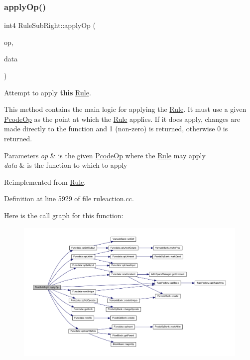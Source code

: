 \subsubsection{\texorpdfstring{applyOp()}{applyOp()}}
{\footnotesize\ttfamily int4 Rule\+Sub\+Right\+::apply\+Op (\begin{DoxyParamCaption}\item[{\mbox{\hyperlink{class_pcode_op}{Pcode\+Op}} $\ast$}]{op,  }\item[{\mbox{\hyperlink{class_funcdata}{Funcdata}} \&}]{data }\end{DoxyParamCaption})\hspace{0.3cm}{\ttfamily [virtual]}}



Attempt to apply {\bfseries{this}} \mbox{\hyperlink{class_rule}{Rule}}. 

This method contains the main logic for applying the \mbox{\hyperlink{class_rule}{Rule}}. It must use a given \mbox{\hyperlink{class_pcode_op}{Pcode\+Op}} as the point at which the \mbox{\hyperlink{class_rule}{Rule}} applies. If it does apply, changes are made directly to the function and 1 (non-\/zero) is returned, otherwise 0 is returned. 
\begin{DoxyParams}{Parameters}
{\em op} & is the given \mbox{\hyperlink{class_pcode_op}{Pcode\+Op}} where the \mbox{\hyperlink{class_rule}{Rule}} may apply \\
\hline
{\em data} & is the function to which to apply \\
\hline
\end{DoxyParams}


Reimplemented from \mbox{\hyperlink{class_rule_a4e3e61f066670175009f60fb9dc60848}{Rule}}.



Definition at line 5929 of file ruleaction.\+cc.

Here is the call graph for this function\+:
\nopagebreak
\begin{figure}[H]
\begin{center}
\leavevmode
\includegraphics[width=350pt]{class_rule_sub_right_a41e3a0031c161d828b8a32239d2c965e_cgraph}
\end{center}
\end{figure}
\mbox{\label{class_rule_sub_right_afb228c3e1286d3fca825a105c0c85870}} 
